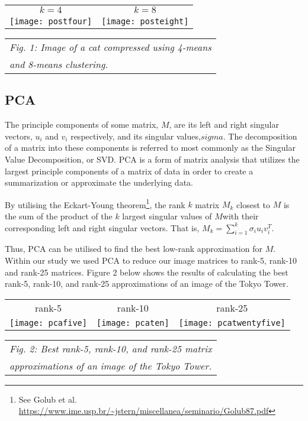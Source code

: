 \documentclass[letterpaper, 10 pt, conference]{ieeeconf}  %
\begin{document}
\vspace*{3mm}
\begin{tabular}{c c}
	$k=4$ & $k=8$ \\
	\texttt{[image: postfour]} &
		\texttt{[image: posteight]} \\
\end{tabular}
\begin{tabular}{l}
	{\it \hspace*{4mm} Fig. 1: Image of a cat compressed using 4-means} \\
	{\it \hspace*{4mm} and 8-means clustering.}
\end{tabular}

\subsection{PCA}
The principle components of some matrix, $M$, are its left and right singular vectors, $u_i$ and $v_i$ respectively, and its singular values,$sigma$. The decomposition of a matrix into these components is referred to most commonly as the Singular Value Decomposition, or SVD.
PCA is a form of matrix analysis that utilizes the largest principle components of a matrix of data in order to create a summarization or approximate the underlying data.

By utilising the Eckart-Young theorem\footnote{See Golub et al. \url{https://www.ime.usp.br/~jstern/miscellanea/seminario/Golub87.pdf}}, the rank $k$ matrix $M_k$ closest to $M$ is the sum of the product of the $k$ largest singular values of $M$with their corresponding left and right singular vectors. That is, $M_k = \sum_{i=1}^k \sigma_i u_i v_i^T$.

Thus, PCA can be utilised to find the best low-rank approximation for $M$.
Within our study we used PCA to reduce our image matrices to rank-5, rank-10 
and rank-25 matrices. Figure 2 below shows the results of calculating the best rank-5, rank-10,
and rank-25 approximations of an image of the Tokyo Tower.

\vspace*{3mm}
\begin{tabular}{c c c}
	rank-5 & rank-10 & rank-25 \\
	\texttt{[image: pcafive]} &
		\texttt{[image: pcaten]} &
		\texttt{[image: pcatwentyfive]} \\
\end{tabular}
\begin{tabular}{l}
	{\it \hspace*{4mm} Fig. 2: Best rank-5, rank-10, and rank-25 matrix} \\
	{\it \hspace*{4mm} approximations of an image of the Tokyo Tower.} \\
\end{tabular}
\end{document}
